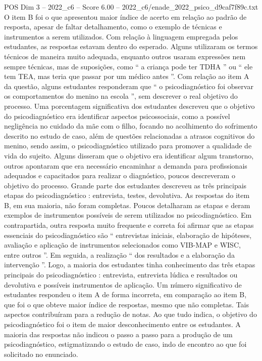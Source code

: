 \begin{textsample}{POS Dim 3 – 2022\_c6 – Score 6.00 – 2022\_c6/enade\_2022\_psico\_d9caf7f89c.txt}
O item B foi o que apresentou maior índice de acerto em relação ao padrão de resposta, apesar de faltar detalhamento, como o exemplo de técnicas e instrumentos a serem utilizados.
Com relação à linguagem empregada pelos estudantes, as respostas estavam dentro do esperado.
Alguns utilizaram os termos técnicos de maneira muito adequada, enquanto outros usaram expressões nem sempre técnicas, mas de suposições, como “ a criança pode ter TDHA ” ou “ ele tem TEA, mas teria que passar por um médico antes ”.
Com relação ao item A da questão, alguns estudantes responderam que “ o psicodiagnóstico foi observar os comportamentos do menino na escola ”, sem descrever o real objetivo do processo.
Uma porcentagem significativa dos estudantes descreveu que o objetivo do psicodiagnóstico era identificar aspectos psicossociais, como a possível negligência no cuidado da mãe com o filho, focando no acolhimento do sofrimento descrito no estudo de caso, além de questões relacionadas a atrasos cognitivos do menino, sendo assim, o psicodiagnóstico utilizado para promover a qualidade de vida do sujeito.
Alguns disseram que o objetivo era identificar algum transtorno, outros apontaram que era necessário encaminhar a demanda para profissionais adequados e capacitados para realizar o diagnóstico, poucos descreveram o objetivo do processo.
Grande parte dos estudantes descreveu as três principais etapas do psicodiagnóstico : entrevista, testes, devolutiva.
As respostas do item B, em sua maioria, não foram completas.
Poucos detalharam as etapas e deram exemplos de instrumentos possíveis de serem utilizados no psicodiagnóstico.
Em contrapartida, outra resposta muito frequente e correta foi afirmar que as etapas essenciais do psicodiagnóstico são “ entrevistas iniciais, elaboração de hipóteses, avaliação e aplicação de instrumentos selecionados como VIB-MAP e WISC, entre outros ”.
Em seguida, a realização “ dos resultados e a elaboração da intervenção ”.
Logo, a maioria dos estudantes tinha conhecimento das três etapas principais do psicodiagnóstico : entrevista, entrevista lúdica e resultados ou devolutiva e possíveis instrumentos de aplicação.
Um número significativo de estudantes respondeu o item A de forma incorreta, em comparação ao item B, que foi o que obteve maior índice de respostas, mesmo que não completas.
Tais aspectos contribuíram para a redução de notas.
Ao que tudo indica, o objetivo do psicodiagnóstico foi o item de maior desconhecimento entre os estudantes.
A maioria das respostas não indicou o passo a passo para a produção de um psicodiagnóstico, estigmatizando o estudo de caso, indo de encontro ao que foi solicitado no enunciado.

\end{textsample}
